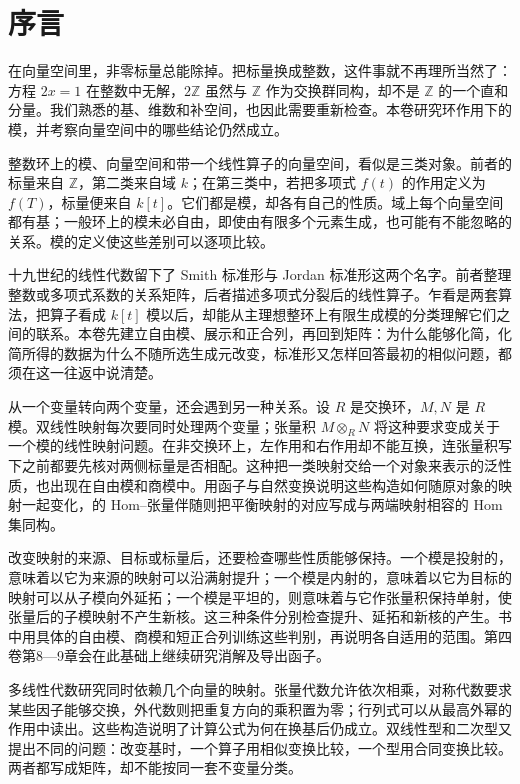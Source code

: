 \chapter*{序言}

在向量空间里，非零标量总能除掉。把标量换成整数，这件事就不再理所当然了：方程 \(2x=1\) 在整数中无解，\(2\mathbb Z\) 虽然与 \(\mathbb Z\) 作为交换群同构，却不是 \(\mathbb Z\) 的一个直和分量。我们熟悉的基、维数和补空间，也因此需要重新检查。本卷研究环作用下的模，并考察向量空间中的哪些结论仍然成立。

\ProseParagraphBreak
整数环上的模、向量空间和带一个线性算子的向量空间，看似是三类对象。前者的标量来自 \(\mathbb Z\)，第二类来自域 \(k\)；在第三类中，若把多项式 \(f(t)\) 的作用定义为 \(f(T)\)，标量便来自 \(k[t]\)。它们都是模，却各有自己的性质。域上每个向量空间都有基；一般环上的模未必自由，即使由有限多个元素生成，也可能有不能忽略的关系。模的定义使这些差别可以逐项比较。

\ProseParagraphBreak
十九世纪的线性代数留下了 Smith 标准形与 Jordan 标准形这两个名字。前者整理整数或多项式系数的关系矩阵，后者描述多项式分裂后的线性算子。乍看是两套算法，把算子看成 \(k[t]\) 模以后，却能从主理想整环上有限生成模的分类理解它们之间的联系。本卷先建立自由模、展示和正合列，再回到矩阵：为什么能够化简，化简所得的数据为什么不随所选生成元改变，标准形又怎样回答最初的相似问题，都须在这一往返中说清楚。

\ProseParagraphBreak
从一个变量转向两个变量，还会遇到另一种关系。设 \(R\) 是交换环，\(M,N\) 是 \(R\) 模。双线性映射每次要同时处理两个变量；张量积 \(M\otimes_RN\) 将这种要求变成关于一个模的线性映射问题。在非交换环上，左作用和右作用却不能互换，连张量积写下之前都要先核对两侧标量是否相配。这种把一类映射交给一个对象来表示的泛性质，也出现在自由模和商模中。用函子与自然变换说明这些构造如何随原对象的映射一起变化，的 Hom--张量伴随则把平衡映射的对应写成与两端映射相容的 Hom 集同构。

\ProseParagraphBreak
改变映射的来源、目标或标量后，还要检查哪些性质能够保持。一个模是投射的，意味着以它为来源的映射可以沿满射提升；一个模是内射的，意味着以它为目标的映射可以从子模向外延拓；一个模是平坦的，则意味着与它作张量积保持单射，使张量后的子模映射不产生新核。这三种条件分别检查提升、延拓和新核的产生。书中用具体的自由模、商模和短正合列训练这些判别，再说明各自适用的范围。第四卷第8—9章会在此基础上继续研究消解及导出函子。

\ProseParagraphBreak
多线性代数研究同时依赖几个向量的映射。张量代数允许依次相乘，对称代数要求某些因子能够交换，外代数则把重复方向的乘积置为零；行列式可以从最高外幂的作用中读出。这些构造说明了计算公式为何在换基后仍成立。双线性型和二次型又提出不同的问题：改变基时，一个算子用相似变换比较，一个型用合同变换比较。两者都写成矩阵，却不能按同一套不变量分类。

